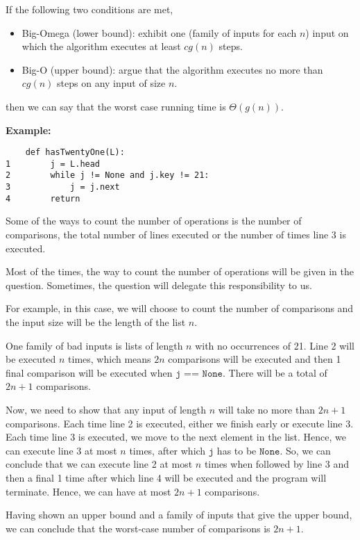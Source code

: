 \documentclass[11pt]{article}
\begin{document}
If the following two conditions are met, 
\begin{itemize}
    \item Big-Omega (lower bound): exhibit one (family of inputs for each $n$) input on which the algorithm executes at least $cg(n)$ steps. 
    \item Big-O (upper bound): argue that the algorithm executes no more than $cg(n)$ steps on any input of size $n$. 
\end{itemize}
then we can say that the worst case running time is $\Theta(g(n))$. 

\textbf{Example:}
\begin{verbatim}
    def hasTwentyOne(L): 
1        j = L.head                     
2        while j != None and j.key != 21:
3            j = j.next                 
4        return                         
\end{verbatim}
Some of the ways to count the number of operations is the number of comparisons, the total number of lines executed or the number of times line 3 is executed.

Most of the times, the way to count the number of operations will be given in the question. Sometimes, the question will delegate this responsibility to us.

For example, in this case, we will choose to count the number of comparisons and the input size will be the length of the list $n$. 

One family of bad inputs is lists of length $n$ with no occurrences of 21. Line 2 will be executed $n$ times, which means $2n$ comparisons will be executed and then 1 final comparison will be executed when $\texttt{j == None}$. There will be a total of $2n+1$ comparisons. 

Now, we need to show that any input of length $n$ will take no more than $2n+1$ comparisons. Each time line 2 is executed, either we finish early or execute line 3. Each time line 3 is executed, we move to the next element in the list. Hence, we can execute line 3 at most $n$ times, after which $\texttt{j}$ has to be $\texttt{None}$. So, we can conclude that we can execute line 2 at most $n$ times when followed by line 3 and then a final 1 time after which line 4 will be executed and the program will terminate. Hence, we can have at most $2n+1$ comparisons. 

Having shown an upper bound and a family of inputs that give the upper bound, we can conclude that the worst-case number of comparisons is $2n+1$. 
\end{document}
